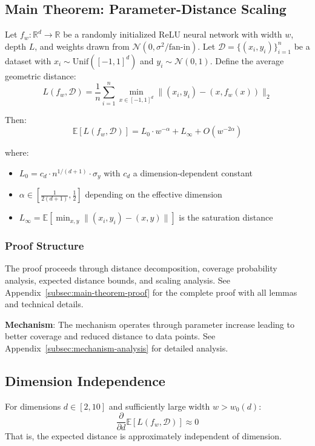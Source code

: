 \subsection{Main Theorem: Parameter-Distance Scaling}

\begin{theorem}
\label{thm:main}
Let $f_w: \mathbb{R}^d \to \mathbb{R}$ be a randomly initialized ReLU neural network with width $w$, depth $L$, and weights drawn from $\mathcal{N}(0, \sigma^2/\text{fan-in})$. Let $\mathcal{D} = \{(x_i, y_i)\}_{i=1}^n$ be a dataset with $x_i \sim \text{Unif}([-1,1]^d)$ and $y_i \sim \mathcal{N}(0,1)$. Define the average geometric distance:
$$L(f_w, \mathcal{D}) = \frac{1}{n} \sum_{i=1}^n \min_{x \in [-1,1]^d} \|(x_i, y_i) - (x, f_w(x))\|_2$$

Then:
$$\mathbb{E}[L(f_w, \mathcal{D})] = L_0 \cdot w^{-\alpha} + L_\infty + O(w^{-2\alpha})$$

where:
\begin{itemize}
    \item $L_0 = c_d \cdot n^{1/(d+1)} \cdot \sigma_y$ with $c_d$ a dimension-dependent constant
    \item $\alpha \in [\frac{1}{2(d+1)}, \frac{1}{2}]$ depending on the effective dimension
    \item $L_\infty = \mathbb{E}[\min_{x,y} \|(x_i, y_i) - (x,y)\|]$ is the saturation distance
\end{itemize}
\end{theorem}

\subsubsection{Proof Structure}

The proof proceeds through distance decomposition, coverage probability analysis, expected distance bounds, and scaling analysis. See Appendix~\ref{subsec:main-theorem-proof} for the complete proof with all lemmas and technical details.

\textbf{Mechanism}: The mechanism operates through parameter increase leading to better coverage and reduced distance to data points. See Appendix~\ref{subsec:mechanism-analysis} for detailed analysis.

\subsection{Dimension Independence}

\begin{theorem}
For dimensions $d \in [2, 10]$ and sufficiently large width $w > w_0(d)$:
$$\frac{\partial}{\partial d} \mathbb{E}[L(f_w, \mathcal{D})] \approx 0$$
That is, the expected distance is approximately independent of dimension.
\end{theorem}

